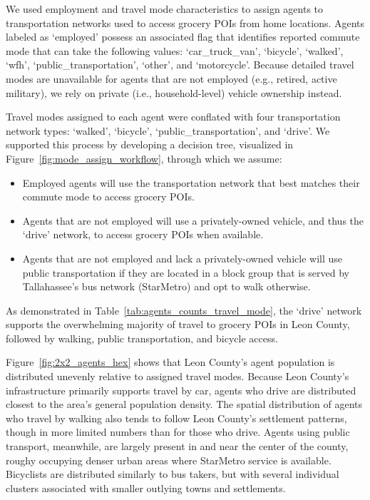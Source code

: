 We used employment and travel mode characteristics to assign agents to transportation networks used to access grocery POIs from home locations. Agents labeled as `employed' possess an associated flag that identifies reported commute mode that can take the following values: `car\_truck\_van', `bicycle', `walked', `wfh', `public\_transportation', `other', and `motorcycle'. Because detailed travel modes are unavailable for agents that are not employed (e.g., retired, active military), we rely on private (i.e., household-level) vehicle ownership instead.



Travel modes assigned to each agent were conflated with four transportation network types: `walked', `bicycle', `public\_transportation', and `drive'. We supported this process by developing a decision tree, visualized in Figure~\ref{fig:mode_assign_workflow}, through which we assume:

\begin{itemize}
    \item Employed agents will use the transportation network that best matches their commute mode to access grocery POIs.
    \item Agents that are not employed will use a privately-owned vehicle, and thus the `drive' network, to access grocery POIs when available.
    \item Agents that are not employed and lack a privately-owned vehicle will use public transportation if they are located in a block group that is served by Tallahassee's bus network (StarMetro) and opt to walk otherwise. 
\end{itemize}

As demonstrated in Table~\ref{tab:agents_counts_travel_mode}, the `drive' network supports the overwhelming majority of travel to grocery POIs in Leon County, followed by walking, public transportation, and bicycle access. 



Figure~\ref{fig:2x2_agents_hex} shows that Leon County's agent population is distributed unevenly relative to assigned travel modes. Because Leon County's infrastructure primarily supports travel by car, agents who drive are distributed closest to the area's general population density. The spatial distribution of agents who travel by walking also tends to follow Leon County's settlement patterns, though in more limited numbers than for those who drive. Agents using public transport, meanwhile, are largely present in and near the center of the county, roughy occupying denser urban areas where StarMetro service is available. Bicyclists are distributed similarly to bus takers, but with several individual clusters associated with smaller outlying towns and settlements. 

